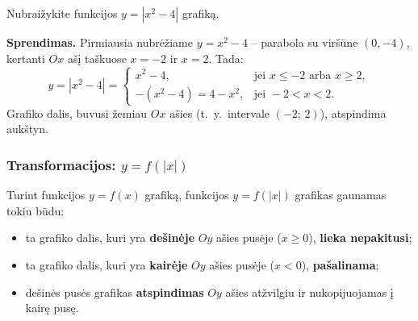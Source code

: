 \begin{example}
Nubraižykite funkcijos $y = |x^2 - 4|$ grafiką.

\textbf{Sprendimas.}
Pirmiausia nubrėžiame $y = x^2 - 4$ – parabola su viršūne $(0, -4)$, kertanti $Ox$ ašį taškuose $x = -2$ ir $x = 2$. Tada:
\[
y = |x^2 - 4| = \begin{cases} x^2 - 4, & \text{jei } x \leq -2 \text{ arba } x \geq 2, \\ -(x^2 - 4) = 4 - x^2, & \text{jei } -2 < x < 2. \end{cases}
\]
Grafiko dalis, buvusi žemiau $Ox$ ašies (t.~y.\ intervale $(-2;\, 2)$), atspindima aukštyn.

\begin{center}
\end{center}
\end{example}

\subsubsection*{Transformacijos: \texorpdfstring{$y = f(|x|)$}{y = f(|x|)}}

Turint funkcijos $y = f(x)$ grafiką, funkcijos $y = f(|x|)$ grafikas gaunamas tokiu būdu:
\begin{itemize}
    \item ta grafiko dalis, kuri yra \textbf{dešinėje} $Oy$ ašies pusėje ($x \geq 0$), \textbf{lieka nepakitusi};
    \item ta grafiko dalis, kuri yra \textbf{kairėje} $Oy$ ašies pusėje ($x < 0$), \textbf{pašalinama};
    \item dešinės pusės grafikas \textbf{atspindimas} $Oy$ ašies atžvilgiu ir nukopijuojamas į kairę pusę.
\end{itemize}

